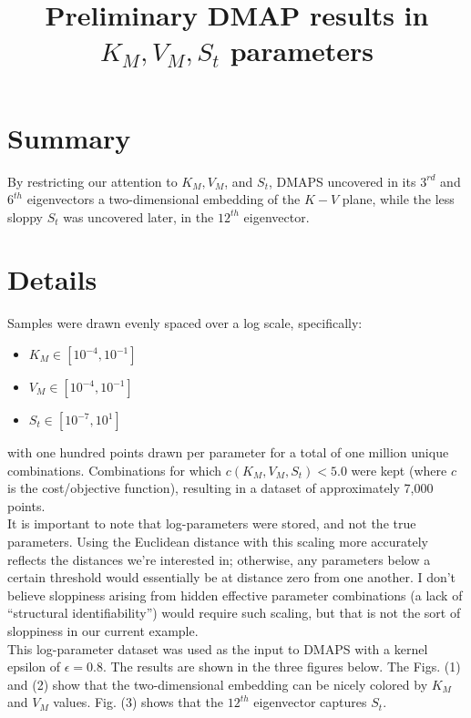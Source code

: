 \documentclass[11pt]{article}
\title{Preliminary DMAP results in $K_M, V_M, S_t$ parameters}
\author{}
\begin{document}
\maketitle

\section*{Summary}
By restricting our attention to $K_M, V_M$, and $S_t$, DMAPS uncovered in its $3^{rd}$ and $6^{th}$ eigenvectors a two-dimensional embedding of the $K-V$ plane, while the less sloppy $S_t$ was uncovered later, in the $12^{th}$ eigenvector.

\section*{Details}
Samples were drawn evenly spaced over a log scale, specifically:

\begin{itemize}
\item $K_M \in [10^{-4}, 10^{-1}]$ 
\item $V_M \in [10^{-4}, 10^{-1}]$ 
\item $S_t \in [10^{-7}, 10^{1}]$ 
\end{itemize}

with one hundred points drawn per parameter for a total of one million unique combinations. Combinations for which $c(K_M, V_M, S_t) < 5.0$ were kept (where $c$ is the cost/objective function), resulting in a dataset of approximately 7,000 points. \\

It is important to note that log-parameters were stored, and not the true parameters. Using the Euclidean distance with this scaling more accurately reflects the distances we're interested in; otherwise, any parameters below a certain threshold would essentially be at distance zero from one another. I don't believe sloppiness arising from hidden effective parameter combinations (a lack of ``structural identifiability'') would require such scaling, but that is not the sort of sloppiness in our current example. \\

This log-parameter dataset was used as the input to DMAPS with a kernel epsilon of $\epsilon = 0.8$. The results are shown in the three figures below. The Figs. (1) and (2) show that the two-dimensional embedding can be nicely colored by $K_M$ and $V_M$ values. Fig. (3) shows that the $12^{th}$ eigenvector captures $S_t$.
\end{document}
